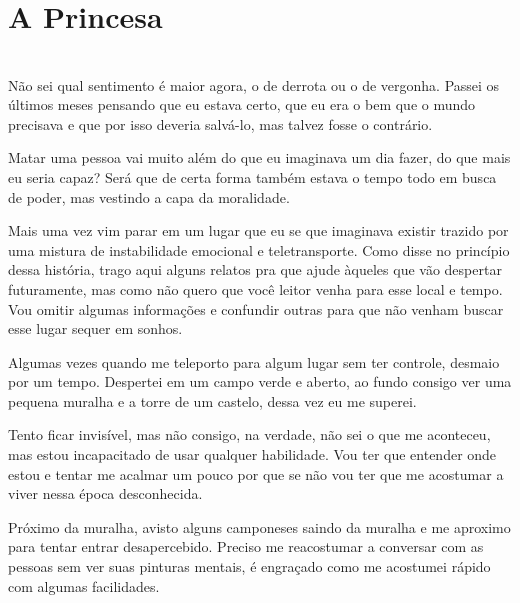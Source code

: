 
    
    
    
    \newpage
    
    
    \ifdefined\useChapters
    \chapter{A Princesa}
    
\else
\chapter{}
\fi


Não sei qual sentimento é maior agora, o de derrota ou o de vergonha. Passei os últimos meses pensando que eu estava certo, que eu era o bem que o mundo precisava e que por isso deveria salvá-lo, mas talvez fosse o contrário.

Matar uma pessoa vai muito além do que eu imaginava um dia fazer, do que mais eu seria capaz? Será que de certa forma também estava o tempo todo em busca de poder, mas vestindo a capa da moralidade.

Mais uma vez vim parar em um lugar que eu se que imaginava existir trazido por uma mistura de instabilidade emocional e teletransporte. Como disse no princípio dessa história, trago aqui alguns relatos pra que ajude àqueles que vão despertar futuramente, mas como não quero que você leitor venha para esse local e tempo. Vou omitir algumas informações e confundir outras para que não venham buscar esse lugar sequer em sonhos.

Algumas vezes quando me teleporto para algum lugar sem ter controle, desmaio por um tempo. Despertei em um campo verde e aberto, ao fundo consigo ver uma pequena muralha e a torre de um castelo, dessa vez eu me superei.

Tento ficar invisível, mas não consigo, na verdade, não sei o que me aconteceu, mas estou incapacitado de usar qualquer habilidade. Vou ter que entender onde estou e tentar me acalmar um pouco por que se não vou ter que me acostumar a viver nessa época desconhecida.

Próximo da muralha, avisto alguns camponeses saindo da muralha e me aproximo para tentar entrar desapercebido. Preciso me reacostumar a conversar com as pessoas sem ver suas pinturas mentais, é engraçado como me acostumei rápido com algumas facilidades.

